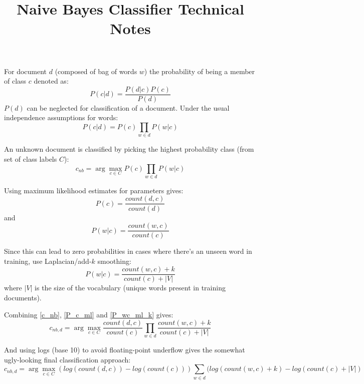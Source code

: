 \documentclass{article}
\title{Naive Bayes Classifier Technical Notes}
\begin{document}
For document $d$ (composed of bag of words $w$) the probability of being a member of class $c$ denoted as:
\begin{equation}\label{P_cd1}
P(c|d) = \frac{ P(d|c) P(c) }{P(d)}
\end{equation}
$P(d)$ can be neglected for classification of a document.  Under the usual independence assumptions for words:
\begin{equation}\label{P_cd2}
P(c|d) = P(c) \prod_{w \in d}P(w|c)
\end{equation}

An unknown document is classified by picking the highest probability class (from set of class labels $C$):
\begin{equation}\label{c_nb}
c_{nb} = \arg\max_{c \in C} P(c) \prod_{w \in d} P(w|c)
\end{equation}


Using maximum likelihood estimates for parameters gives:
\begin{equation}\label{P_c_ml}
P(c) = \frac{count(d,c)}{count(d)}
\end{equation}
and
\begin{equation}\label{P_wc_ml}
P(w|c) = \frac{ count(w,c) }{count(c)}
\end{equation}

Since this can lead to zero probabilities in cases where there's an unseen word in training, use Laplacian/add-$k$ smoothing:
\begin{equation}\label{P_wc_ml_k}
P(w|c) = \frac{ count(w,c)+k}{count(c)+|V|}
\end{equation}
where $|V|$ is the size of the vocabulary (unique words present in training documents).

Combining \ref{c_nb}, \ref{P_c_ml} and \ref{P_wc_ml_k} gives:
\begin{equation}
c_{nb,d} = \arg\max_{c \in C} \frac{count(d,c)}{count(c)} \prod_{w \in d}\frac{count(w,c)+k}{count(c) + |V|}
\end{equation}

And using logs (base 10) to avoid floating-point underflow gives the somewhat ugly-looking final classification approach:
\begin{equation}
c_{nb,d} = \arg\max_{c \in C} (log(count(d,c)) - log(count(c)))  \sum_{w \in d} ( log(count(w,c)+k) - log(count(c) + |V|)
\end{equation}
\end{document}

